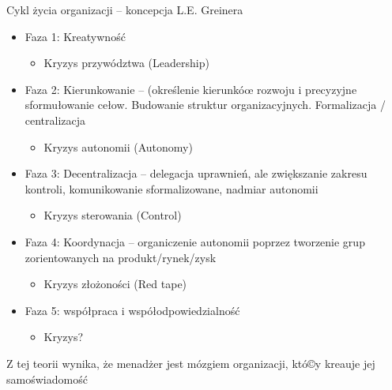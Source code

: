 \documentclass[a4paper,10pt]{report}
\begin{document}
\noindent Cykl życia organizacji -- koncepcja L.E. Greinera
\begin{itemize}
	\item Faza 1: Kreatywność 
	\begin{itemize}
		\item Kryzys przywództwa (Leadership)
	\end{itemize}
	\item Faza 2: Kierunkowanie -- (określenie kierunkóœ rozwoju i precyzyjne sformułowanie cełow. Budowanie struktur organizacyjnych. Formalizacja / centralizacja
	\begin{itemize}
		\item Kryzys autonomii (Autonomy)
	\end{itemize}
	\item Faza 3: Decentralizacja -- delegacja uprawnień, ale zwiększanie zakresu kontroli, komunikowanie sformalizowane, nadmiar autonomii
	\begin{itemize}
		\item Kryzys sterowania (Control)
	\end{itemize}
	\item Faza 4: Koordynacja -- organiczenie autonomii poprzez tworzenie grup zorientowanych na produkt/rynek/zysk
	\begin{itemize}
		\item Kryzys złożoności (Red tape)
	\end{itemize}
	\item Faza 5: współpraca i współodpowiedzialność
	\begin{itemize}
		\item Kryzys?
	\end{itemize}
\end{itemize}

Z tej teorii wynika, że menadżer jest mózgiem organizacji, któ©y kreauje jej samoświadomość
\end{document}
